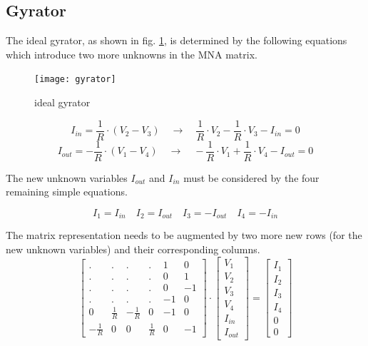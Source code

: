 \subsection{Gyrator}

The ideal gyrator, as shown in fig. \ref{fig:gyrator}, is determined
by the following equations which introduce two more unknowns in the
MNA matrix.

\begin{figure}[ht]
\begin{center}
\texttt{[image: gyrator]}
\end{center}
\caption{ideal gyrator}
\label{fig:gyrator}
\end{figure}
\FloatBarrier

\begin{equation}
I_{in} = \frac{1}{R}\cdot\left(V_{2} - V_{3}\right)
\quad \rightarrow \quad
\frac{1}{R}\cdot V_{2} - \frac{1}{R}\cdot V_{3} - I_{in} = 0
\end{equation}
\begin{equation}
I_{out} = -\frac{1}{R}\cdot\left(V_{1} - V_{4}\right)
\quad \rightarrow \quad
-\frac{1}{R}\cdot V_{1} + \frac{1}{R}\cdot V_{4} - I_{out} = 0
\label{eq:gyrator}
\end{equation}

The new unknown variables $I_{out}$ and $I_{in}$ must be considered by
the four remaining simple equations.

\begin{equation}
I_{1} = I_{in} \quad I_{2} = I_{out} \quad I_{3} = -I_{out} \quad I_{4} = -I_{in}
\end{equation}

The matrix representation needs to be augmented by two more new rows
(for the new unknown variables) and their corresponding columns.
\begin{equation}
\begin{bmatrix}
.&.&.&.& 1 & 0\\
.&.&.&.& 0 & 1\\
.&.&.&.& 0 & -1\\
.&.&.&.& -1 & 0\\
0 & \frac{1}{R} & -\frac{1}{R} & 0 & -1 & 0\\
-\frac{1}{R} & 0 & 0 & \frac{1}{R} & 0 & -1
\end{bmatrix}
\cdot
\begin{bmatrix}
V_{1}\\
V_{2}\\
V_{3}\\
V_{4}\\
I_{in}\\
I_{out}
\end{bmatrix}
=
\begin{bmatrix}
I_{1}\\
I_{2}\\
I_{3}\\
I_{4}\\
0\\
0
\end{bmatrix}
\end{equation}

